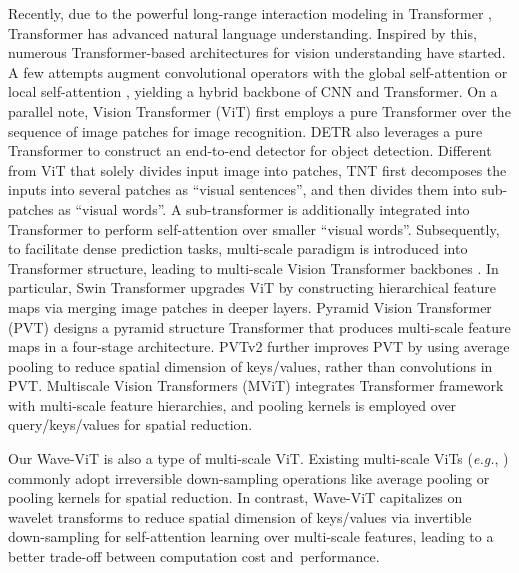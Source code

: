 \documentclass[runningheads]{llncs}
\begin{document}
Recently, due to the powerful long-range interaction modeling in Transformer \cite{vaswani2017attention}, Transformer has advanced natural language understanding. Inspired by this, numerous Transformer-based architectures for vision understanding have started. A few attempts augment convolutional operators with the global self-attention \cite{bello2019attention} or local self-attention \cite{hu2019local,ramachandran2019stand,srinivas2021bottleneck,zhao2020exploring}, yielding a hybrid backbone of CNN and Transformer. On a parallel note, Vision Transformer (ViT) \cite{dosovitskiy2020image} first employs a pure Transformer over the sequence of image patches for image recognition. DETR \cite{carion2020end} also leverages a pure Transformer to construct an end-to-end detector for object detection.
Different from ViT that solely divides input image into patches, TNT \cite{han2021transformer} first decomposes the inputs into several patches as ``visual sentences'', and then divides them into sub-patches as ``visual words''. A sub-transformer is additionally integrated into Transformer to perform self-attention over smaller ``visual words''.
Subsequently, to facilitate dense prediction tasks, multi-scale paradigm is introduced into Transformer structure, leading to multi-scale Vision Transformer backbones \cite{fan2021multiscale,liu2021swin,wang2021pvtv2,wang2021pyramid}. In particular, Swin Transformer \cite{liu2021swin} upgrades ViT by constructing hierarchical feature maps via merging image patches in deeper layers. Pyramid Vision Transformer (PVT) \cite{wang2021pyramid} designs a pyramid structure Transformer that produces multi-scale feature maps in a four-stage architecture. PVTv2 \cite{wang2021pvtv2} further improves PVT by using average pooling to reduce spatial dimension of keys/values, rather than convolutions in PVT. Multiscale Vision Transformers (MViT) \cite{fan2021multiscale} integrates Transformer framework with multi-scale feature hierarchies, and pooling kernels is employed over query/keys/values for spatial reduction.

Our Wave-ViT is also a type of multi-scale ViT. Existing multi-scale ViTs (\emph{e.g.}, \cite{fan2021multiscale,wang2021pvtv2,wang2021pyramid}) commonly adopt irreversible down-sampling operations like average pooling or pooling kernels for spatial reduction. In contrast, Wave-ViT capitalizes on wavelet transforms to reduce spatial dimension of keys/values via invertible down-sampling for self-attention learning over multi-scale features, leading to a better trade-off between computation cost and~performance.
\end{document}
